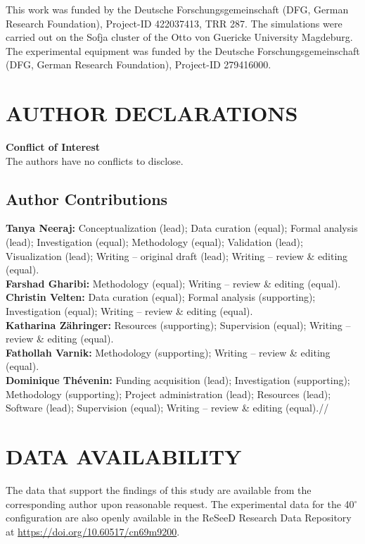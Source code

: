 \begin{acknowledgments}
This work was funded by the Deutsche Forschungsgemeinschaft (DFG, German Research Foundation), Project-ID 422037413, TRR 287. The simulations were carried out on the Sofja cluster of the Otto von Guericke University Magdeburg.
The experimental equipment was funded by the Deutsche Forschungsgemeinschaft (DFG, German Research Foundation), Project-ID 279416000.
\end{acknowledgments}

\section*{AUTHOR DECLARATIONS}
\textbf{Conflict of Interest}\\ The authors have no conflicts to disclose.
\subsection*{Author Contributions}
\textbf{Tanya Neeraj:} Conceptualization (lead); Data curation (equal); Formal analysis (lead); Investigation (equal); Methodology (equal); Validation (lead); Visualization (lead); Writing -- original draft (lead); Writing -- review \& editing (equal).\\
\textbf{Farshad Gharibi:} Methodology (equal); Writing -- review \& editing (equal).\\
\textbf{Christin Velten:} Data curation (equal); Formal analysis (supporting); Investigation (equal); Writing -- review \& editing (equal).\\
\textbf{Katharina Z\"ahringer:} Resources (supporting); Supervision (equal); Writing -- review \& editing (equal).\\ %
\textbf{Fathollah Varnik:} Methodology (supporting); Writing -- review \& editing (equal).\\
\textbf{Dominique Th\'evenin:} Funding acquisition (lead); Investigation (supporting); Methodology (supporting); Project administration (lead); Resources (lead); Software (lead); Supervision (equal); Writing -- review \& editing (equal).//
\section*{DATA AVAILABILITY}
The data that support the findings of this study are available from the corresponding author upon reasonable request. The experimental data for the 40$^\circ$ configuration are also openly available in the ReSeeD Research Data Repository at \url{https://doi.org/10.60517/cn69m9200}.

